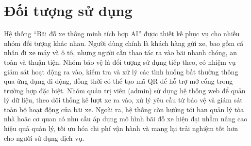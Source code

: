 \section{Đối tượng sử dụng}

Hệ thống “Bãi đỗ xe thông minh tích hợp AI” được thiết kế phục vụ cho nhiều nhóm đối tượng khác nhau. Người dùng chính là khách hàng gửi xe, bao gồm cá nhân đi xe máy và ô tô, những người cần thao tác ra vào bãi nhanh chóng, an toàn và thuận tiện. Nhóm bảo vệ là đối tượng sử dụng tiếp theo, có nhiệm vụ giám sát hoạt động ra vào, kiểm tra và xử lý các tình huống bất thường thông qua ứng dụng di động, đồng thời có thể tạo mã QR để hỗ trợ mở cổng trong trường hợp đặc biệt. Nhóm quản trị viên (admin) sử dụng hệ thống web để quản lý dữ liệu, theo dõi thống kê lượt xe ra vào, xử lý yêu cầu từ bảo vệ và giám sát toàn bộ hoạt động của bãi xe. Ngoài ra, hệ thống còn hướng tới ban quản lý tòa nhà hoặc cơ quan có nhu cầu áp dụng mô hình bãi đỗ xe hiện đại nhằm nâng cao hiệu quả quản lý, tối ưu hóa chi phí vận hành và mang lại trải nghiệm tốt hơn cho người sử dụng dịch vụ.